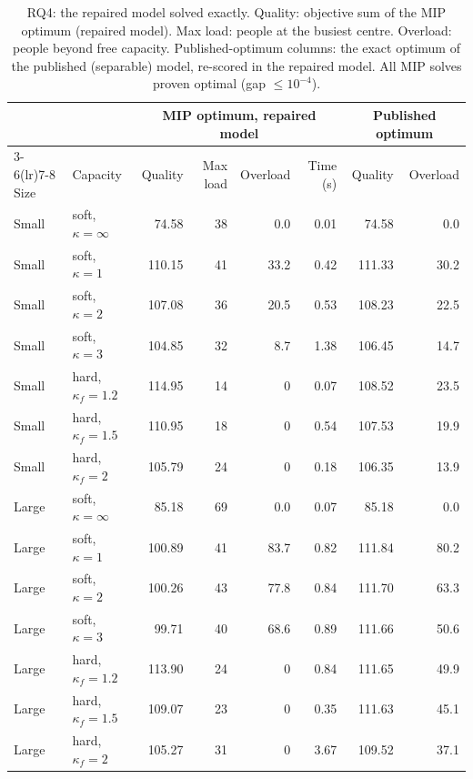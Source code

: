 \documentclass[systems,article,submit,moreauthors,pdftex]{Definitions/mdpi}
\begin{document}
\begin{table}[H]
\centering
\caption{RQ4: the repaired model solved exactly. Quality: objective sum of the MIP optimum
(repaired model). Max load: people at the busiest centre. Overload: people beyond free
capacity. Published-optimum columns: the exact optimum of the published (separable) model,
re-scored in the repaired model. All MIP solves proven optimal (gap $\le 10^{-4}$).\label{tab:rq4}}
\small
\begin{tabular}{llrrrrrr}
\toprule
& & \multicolumn{4}{c}{MIP optimum, repaired model} & \multicolumn{2}{c}{Published optimum}\\
\cmidrule(lr){3-6}\cmidrule(lr){7-8}
Size & Capacity & Quality & Max load & Overload & Time (s) & Quality & Overload\\
\midrule
Small & soft, $\kappa=\infty$ & 74.58 & 38 & 0.0 & 0.01 & 74.58 & 0.0\\
Small & soft, $\kappa=1$ & 110.15 & 41 & 33.2 & 0.42 & 111.33 & 30.2\\
Small & soft, $\kappa=2$ & 107.08 & 36 & 20.5 & 0.53 & 108.23 & 22.5\\
Small & soft, $\kappa=3$ & 104.85 & 32 & 8.7 & 1.38 & 106.45 & 14.7\\
Small & hard, $\kappa_f=1.2$ & 114.95 & 14 & 0 & 0.07 & 108.52 & 23.5\\
Small & hard, $\kappa_f=1.5$ & 110.95 & 18 & 0 & 0.54 & 107.53 & 19.9\\
Small & hard, $\kappa_f=2$ & 105.79 & 24 & 0 & 0.18 & 106.35 & 13.9\\
\midrule
Large & soft, $\kappa=\infty$ & 85.18 & 69 & 0.0 & 0.07 & 85.18 & 0.0\\
Large & soft, $\kappa=1$ & 100.89 & 41 & 83.7 & 0.82 & 111.84 & 80.2\\
Large & soft, $\kappa=2$ & 100.26 & 43 & 77.8 & 0.84 & 111.70 & 63.3\\
Large & soft, $\kappa=3$ & 99.71 & 40 & 68.6 & 0.89 & 111.66 & 50.6\\
Large & hard, $\kappa_f=1.2$ & 113.90 & 24 & 0 & 0.84 & 111.65 & 49.9\\
Large & hard, $\kappa_f=1.5$ & 109.07 & 23 & 0 & 0.35 & 111.63 & 45.1\\
Large & hard, $\kappa_f=2$ & 105.27 & 31 & 0 & 3.67 & 109.52 & 37.1\\
\bottomrule
\end{tabular}
\end{table}
\end{document}
